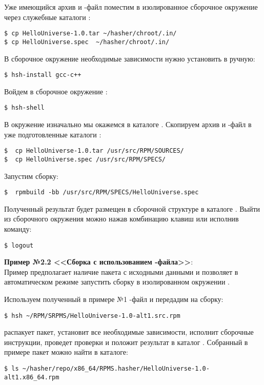 Уже имеющийся архив и -файл поместим в изолированное сборочное
окружение через служебные каталоги :

\begin{verbatim}
$ cp HelloUniverse-1.0.tar ~/hasher/chroot/.in/
$ cp HelloUniverse.spec  ~/hasher/chroot/.in/
\end{verbatim}

В сборочное окружение необходимые зависимости нужно установить в ручную:
\begin{verbatim}
$ hsh-install gcc-c++
\end{verbatim}

Войдем в сборочное окружение :
\begin{verbatim}
$ hsh-shell
\end{verbatim}

В окружение  изначально мы окажемся в каталоге .
Скопируем архив и -файл в уже подготовленные каталоги :
\begin{verbatim}
$  cp HelloUniverse-1.0.tar /usr/src/RPM/SOURCES/
$  cp HelloUniverse.spec /usr/src/RPM/SPECS/
\end{verbatim}

Запустим сборку:
\begin{verbatim}
$  rpmbuild -bb /usr/src/RPM/SPECS/HelloUniverse.spec
\end{verbatim}

Полученный результат будет размещен в сборочной структуре 
в каталоге . Выйти из сборочного окружения можно
нажав комбинацию клавиш  или исполнив команду:
\begin{verbatim}
$ logout
\end{verbatim}

\textbf{Пример №2.2 <<Сборка с использованием -файла>>}:\\

Пример предполагает наличие пакета с исходными данными  и
позволяет в автоматическом режиме запустить сборку в изолированном окружении
.

Используем полученный в примере №1 -файл и передадим на сборку:
\begin{verbatim}
$ hsh ~/RPM/SRPMS/HelloUniverse-1.0-alt1.src.rpm
\end{verbatim}

 распакует пакет, установит все необходимые зависимости, исполнит
сборочные инструкции, проведет проверки и положит результат в каталог
. Собранный в примере пакет можно найти в каталоге:
\begin{verbatim}
$ ls ~/hasher/repo/x86_64/RPMS.hasher/HelloUniverse-1.0-alt1.x86_64.rpm
\end{verbatim}

